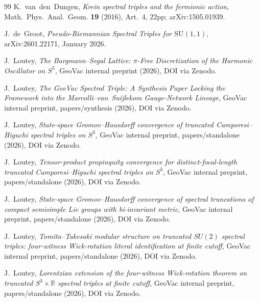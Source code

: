 \documentclass[11pt,a4paper]{article}
\theoremstyle{plain}
\theoremstyle{definition}
\newcommand{\sthree}{S^{3}}
\begin{document}
\begin{thebibliography}{99}
K.~van~den~Dungen,
\newblock \emph{Krein spectral triples and the fermionic action},
\newblock Math.~Phys.~Anal.~Geom. \textbf{19} (2016), Art.~4, 22pp;
\newblock arXiv:1505.01939.

J.~de~Groot,
\newblock \emph{Pseudo-Riemannian Spectral Triples for $\mathrm{SU}(1,1)$},
\newblock arXiv:2601.22171, January 2026.

J.~Loutey,
\newblock \emph{The Bargmann--Segal Lattice: $\pi$-Free Discretization
of the Harmonic Oscillator on $S^5$},
\newblock GeoVac internal preprint (2026), DOI via Zenodo.

J.~Loutey,
\newblock \emph{The GeoVac Spectral Triple: A Synthesis Paper Locking
the Framework into the Marcolli--van~Suijlekom Gauge-Network Lineage},
\newblock GeoVac internal preprint, papers/synthesis (2026),
DOI via Zenodo.

J.~Loutey,
\newblock \emph{State-space Gromov--Hausdorff convergence of truncated
Camporesi--Higuchi spectral triples on $S^3$},
\newblock GeoVac internal preprint, papers/standalone (2026),
DOI via Zenodo.

J.~Loutey,
\newblock \emph{Tensor-product propinquity convergence for
distinct-focal-length truncated Camporesi--Higuchi spectral triples on
$\sthree$},
\newblock GeoVac internal preprint, papers/standalone (2026),
DOI via Zenodo.

J.~Loutey,
\newblock \emph{State-space Gromov--Hausdorff convergence of spectral
truncations of compact semisimple Lie groups with bi-invariant metric},
\newblock GeoVac internal preprint, papers/standalone (2026),
DOI via Zenodo.

J.~Loutey,
\newblock \emph{Tomita--Takesaki modular structure on truncated
$SU(2)$ spectral triples: four-witness Wick-rotation literal
identification at finite cutoff},
\newblock GeoVac internal preprint, papers/standalone (2026),
DOI via Zenodo.

J.~Loutey,
\newblock \emph{Lorentzian extension of the four-witness Wick-rotation
theorem on truncated $S^3 \times \mathbb{R}$ spectral triples at finite
cutoff},
\newblock GeoVac internal preprint, papers/standalone (2026),
DOI via Zenodo.


\end{thebibliography}
\end{document}
